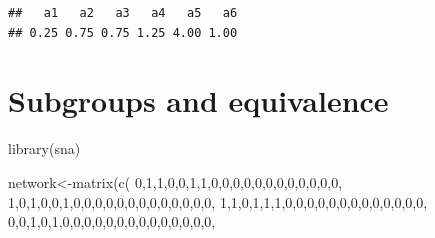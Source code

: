 \documentclass[
  notitlepage,
  onecolumn,
  openany]{book}
\newenvironment{Shaded}{\begin{snugshade}}{\end{snugshade}}
\newcommand{\DecValTok}[1]{\textcolor[rgb]{0.00,0.00,0.81}{#1}}
\newcommand{\FunctionTok}[1]{\textcolor[rgb]{0.00,0.00,0.00}{#1}}
\newcommand{\NormalTok}[1]{#1}
\newcommand{\OtherTok}[1]{\textcolor[rgb]{0.56,0.35,0.01}{#1}}
\begin{document}
\begin{verbatim}
##   a1   a2   a3   a4   a5   a6 
## 0.25 0.75 0.75 1.25 4.00 1.00
\end{verbatim}

\hypertarget{subgroups-and-equivalence}{%
\chapter{Subgroups and equivalence}\label{subgroups-and-equivalence}}

\begin{Shaded}
\begin{Highlighting}[]
\FunctionTok{library}\NormalTok{(sna)}

\NormalTok{network}\OtherTok{\textless{}{-}}\FunctionTok{matrix}\NormalTok{(}\FunctionTok{c}\NormalTok{(}
  \DecValTok{0}\NormalTok{,}\DecValTok{1}\NormalTok{,}\DecValTok{1}\NormalTok{,}\DecValTok{0}\NormalTok{,}\DecValTok{0}\NormalTok{,}\DecValTok{1}\NormalTok{,}\DecValTok{1}\NormalTok{,}\DecValTok{0}\NormalTok{,}\DecValTok{0}\NormalTok{,}\DecValTok{0}\NormalTok{,}\DecValTok{0}\NormalTok{,}\DecValTok{0}\NormalTok{,}\DecValTok{0}\NormalTok{,}\DecValTok{0}\NormalTok{,}\DecValTok{0}\NormalTok{,}\DecValTok{0}\NormalTok{,}\DecValTok{0}\NormalTok{,}\DecValTok{0}\NormalTok{,}\DecValTok{0}\NormalTok{,}
  \DecValTok{1}\NormalTok{,}\DecValTok{0}\NormalTok{,}\DecValTok{1}\NormalTok{,}\DecValTok{0}\NormalTok{,}\DecValTok{0}\NormalTok{,}\DecValTok{1}\NormalTok{,}\DecValTok{0}\NormalTok{,}\DecValTok{0}\NormalTok{,}\DecValTok{0}\NormalTok{,}\DecValTok{0}\NormalTok{,}\DecValTok{0}\NormalTok{,}\DecValTok{0}\NormalTok{,}\DecValTok{0}\NormalTok{,}\DecValTok{0}\NormalTok{,}\DecValTok{0}\NormalTok{,}\DecValTok{0}\NormalTok{,}\DecValTok{0}\NormalTok{,}\DecValTok{0}\NormalTok{,}\DecValTok{0}\NormalTok{,}
  \DecValTok{1}\NormalTok{,}\DecValTok{1}\NormalTok{,}\DecValTok{0}\NormalTok{,}\DecValTok{1}\NormalTok{,}\DecValTok{1}\NormalTok{,}\DecValTok{1}\NormalTok{,}\DecValTok{0}\NormalTok{,}\DecValTok{0}\NormalTok{,}\DecValTok{0}\NormalTok{,}\DecValTok{0}\NormalTok{,}\DecValTok{0}\NormalTok{,}\DecValTok{0}\NormalTok{,}\DecValTok{0}\NormalTok{,}\DecValTok{0}\NormalTok{,}\DecValTok{0}\NormalTok{,}\DecValTok{0}\NormalTok{,}\DecValTok{0}\NormalTok{,}\DecValTok{0}\NormalTok{,}\DecValTok{0}\NormalTok{,}
  \DecValTok{0}\NormalTok{,}\DecValTok{0}\NormalTok{,}\DecValTok{1}\NormalTok{,}\DecValTok{0}\NormalTok{,}\DecValTok{1}\NormalTok{,}\DecValTok{0}\NormalTok{,}\DecValTok{0}\NormalTok{,}\DecValTok{0}\NormalTok{,}\DecValTok{0}\NormalTok{,}\DecValTok{0}\NormalTok{,}\DecValTok{0}\NormalTok{,}\DecValTok{0}\NormalTok{,}\DecValTok{0}\NormalTok{,}\DecValTok{0}\NormalTok{,}\DecValTok{0}\NormalTok{,}\DecValTok{0}\NormalTok{,}\DecValTok{0}\NormalTok{,}\DecValTok{0}\NormalTok{,}\DecValTok{0}\NormalTok{,}

\end{Highlighting}
\end{Shaded}
\end{document}
